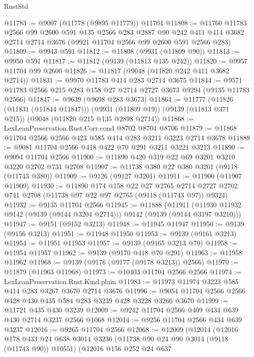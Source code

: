 \begin{lexlean}{RustStd}
\begin{coremodule}
@11783 := @9007 (@11778 (@9895 @11779)) @11704
@11808 := @11760
    @11783
    @2566
    @99
    @2600
    @591
    @135
    @2566
    @283
    @2887
    @90
    @242
    @411
    @414
    @3682
    @2714
    @2714
    @3676
    (@9921 @11704 @2566 @99 @2600 @591 @2566 @283)
@11809 := @9943 @591
@11812 := @11808 (@9931 (@11809 @90))
@11813 := @9950 @591
@11817 := @11812 (@9139 (@11813 @135 @242))
@11820 := @9957 @11704 @99 @2600
@11826 := @11817 (@9048 (@11820 @242 @411 @3682 @2714))
@11831 := @9970 @11783 @414 @283 @2714 @3675
@11844 := @9571 @11783 @2566 @215 @283 @158 @27 @2714 @2727 @3673 @9294 (@9135 @11783 @2566)
@11847 := @9639 (@9698 @283 @3673)
@11864 := @11777
    (@11826 (@11831 (@11844 @11847)))
    (@9931 (@11809 @19))
    (@9139 (@11813 @371 @215))
    (@9048 (@11820 @215 @135 @2898 @2714))
@11868 := LexLeanPreservation.Rust.Corr.cond @8702 @8704 @8706
@11879 := @11868 @11704 @2566 @2566 @423 @585 @414 @283 @3211 @3223 @2714 @3678
@11888 := @9081 @11704 @2566 @418 @422 @70 @291 @3211 @3221 @3213
@11890 := @9094 @11704 @2566
@11900 := @11890 @420 @319 @22 @69 @3201 @3210 @3220 @2702 @731 @2708
@11907 := @11738 @380 @22 @380 @3201 (@9118 (@11743 @380))
@11909 := @9126 (@9127 @3201)
@11911 := @11900 (@11907 @11909)
@11930 := @11890
    @174
    @158
    @22
    @27
    @2765
    @2714
    @2727
    @2702
    @741
    @2708
    (@11738 @97 @22 @97 @2765 (@9118 (@11743 @97)) @9324)
@11932 := @9135 @11704 @2566
@11945 := @11888
    (@11911 (@11930 @11932 @9142 (@9139 (@9144 @3204 @2714))) @9142 (@9139 (@9144 @3197 @3210)))
@11947 := @9151 (@9152 @3213)
@11948 := @11945 @11947
@11950 := @9139 (@9156 @3213)
@11951 := @11948 @11950
@11953 := @9139 (@9161 @3213)
@11954 := @11951 @11953
@11957 := @9139 (@9165 @3213 @70)
@11958 := @11954 @11957
@11962 := @9139 (@9170 @418 @70 @291)
@11963 := @11958 @11962
@11968 := @9139 (@9176 (@9177 (@9178 @3213)) @2566)
@11970 := @11879 (@11963 @11968)
@11973 := @10403 @11704 @2566 @2566
@11974 := LexLeanPreservation.Rust.Kind.plain
@11983 := @11973 @11974 @3223 @585 @414 @283 @3267 @3670 @2714 @3676
@11996 := @9054 @11704 @2566 @2566 @428 @430 @435 @584 @283 @3239 @428 @3228 @3266 @3670
@11999 := @11721 @435 @430 @3239
@12009 := @9242 @11704 @2566 @409 @434 @639 @430 @2714 @3237 @2566 @1068
@12014 := @9256 @11704 @2566 @434 @639 @3237
@12016 := @9265 @11704 @2566
@12068 := @12009
    (@12014
      (@12016
        @178
        @433
        @24
        @638
        @3014
        @3236
        (@11738 @90 @24 @90 @3014 (@9118 (@11743 @90)) @10551)
        (@12016
          @156
          @252
          @24
          @637

\end{coremodule}
\end{lexlean}
